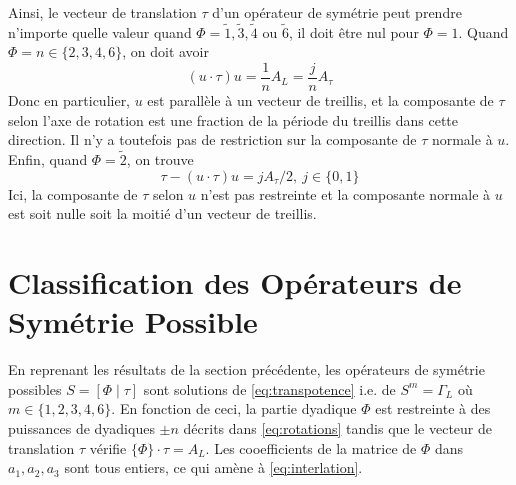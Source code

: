 \documentclass{cours}
\begin{document}
Ainsi, le vecteur de translation $\tau$ d'un opérateur de symétrie peut prendre n'importe quelle valeur quand $\Phi = \tilde{1}, \tilde{3}, \tilde{4}$ ou $\tilde{6}$, il doit être nul pour $\Phi = 1$. Quand $\Phi = n \in \{2, 3, 4, 6\}$, on doit avoir
\begin{equation}
    \left(u \cdot \tau \right)u = \frac{1}{n}A_{L} = \frac{j}{n}A_{\tau}
\end{equation}
Donc en particulier, $u$ est parallèle à un vecteur de treillis, et la composante de $\tau$ selon l'axe de rotation est une fraction de la période du treillis dans cette direction. Il n'y a toutefois pas de restriction sur la composante de $\tau$ normale à $u$. \\
Enfin, quand $\Phi = \tilde{2}$, on trouve
\begin{equation}
    \tau - \left(u \cdot \tau\right)u = jA_{\tau}/2, \ j \in \{0, 1\}
\end{equation}
Ici, la composante de $\tau$ selon $u$ n'est pas restreinte et la composante normale à $u$ est soit nulle soit la moitié d'un vecteur de treillis.


\section{Classification des Opérateurs de Symétrie Possible}
En reprenant les résultats de la section précédente, les opérateurs de symétrie possibles $S = \left[\Phi \mid \tau\right]$ sont solutions de \ref{eq:transpotence} i.e. de $S^{m} = \Gamma_{L}$ où $m \in \{1, 2, 3, 4, 6\}$. En fonction de ceci, la partie dyadique $\Phi$ est restreinte à des puissances de dyadiques $\pm n$ décrits dans \ref{eq:rotations} tandis que le vecteur de translation $\tau$ vérifie $\{\Phi\} \cdot \tau = A_{L}$. Les cooefficients de la matrice de $\Phi$ dans $a_{1}, a_{2}, a_{3}$ sont tous entiers, ce qui amène à \ref{eq:interlation}.
\end{document}
